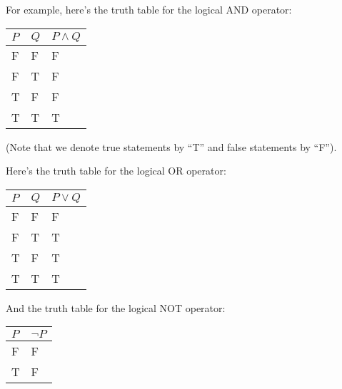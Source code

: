For example, here's the truth table for the logical AND operator:
\begin{table}[h]
    \centering
    \begin{tabular}{|l|l||l|}
        \hline
        $P$ & $Q$ & $P\land Q$ \\ \hline
        F   & F   & F          \\ \hline
        F   & T   & F          \\ \hline
        T   & F   & F          \\ \hline
        T   & T   & T          \\ \hline
    \end{tabular}
\end{table}

(Note that we denote true statements by ``T'' and false statements by ``F'').

Here's the truth table for the logical OR operator:
\begin{table}[h]
    \centering
    \begin{tabular}{|l|l||l|}
        \hline
        $P$ & $Q$ & $P\lor Q$ \\ \hline
        F   & F   & F         \\ \hline
        F   & T   & T         \\ \hline
        T   & F   & T         \\ \hline
        T   & T   & T         \\ \hline
    \end{tabular}
\end{table}

And the truth table for the logical NOT operator:
\begin{table}[h]
    \centering
    \begin{tabular}{|l||l|}
        \hline
        $P$ & $\lnot P$ \\ \hline
        F   & F         \\ \hline
        T   & F         \\ \hline
    \end{tabular}
\end{table}

